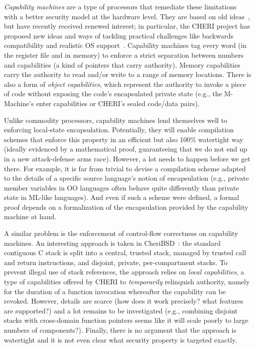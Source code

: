 \documentclass[format=acmsmall, review=true, screen=true]{acmart}
\begin{document}
\emph{Capability machines} are a type of processors that
remediate these limitations with a better security model at
the hardware level. They are based on old ideas~\citep{Carter:1994:HSF:195473.195579,Dennis:1966:PSM:365230.365252,shapiro_eros:_1999},
but have recently received renewed interest; in particular, the CHERI
project has proposed new ideas and ways of tackling practical
challenges like backwards compatibility and realistic OS
support~\citep{Watson2015Cheri,Woodruff:2014:CCM:2665671.2665740}. Capability
machines tag every word (in the register file and in memory) to
enforce a strict separation between numbers and capabilities (a kind
of pointers that carry authority). Memory capabilities carry
the authority to read and/or write to a range of memory
locations. There is also a form of \emph{object capabilities}, which represent the
authority to invoke a piece of code without exposing the code's
encapsulated private state (e.g., the M-Machine's enter capabilities or
CHERI's sealed code/data pairs).

Unlike commodity processors, capability machines lend themselves well to
enforcing local-state encapsulation. Potentially, they will enable compilation
schemes that enforce this property in an efficient but also 100\% watertight way
(ideally evidenced by a mathematical proof, guaranteeing that we do not end up
in a new attack-defense arms race). However, a lot needs to happen before we get
there. For example, it is far from trivial to devise a compilation scheme
adapted to the details of a specific source language's notion of encapsulation
(e.g., private member variables in OO languages often behave quite differently
than private state in ML-like languages). And even if such a scheme were
defined, a formal proof depends on a formalization of the encapsulation provided
by the capability machine at hand.

A similar problem is the enforcement of control-flow correctness on capability
machines. An interesting approach is taken in CheriBSD~\citep{Watson2015Cheri}:
the standard contiguous C stack is split into a central, trusted stack, managed
by trusted call and return instructions, and disjoint, private, per-compartment
stacks. To prevent illegal use of stack references, the approach relies on
\emph{local capabilities}, a type of capabilities offered by CHERI to
\emph{temporarily} relinquish authority, namely for the duration of a function
invocation whereafter the capability can be revoked. However, details are scarce
(how does it work precisely? what features are supported?) and a lot remains to
be investigated (e.g., combining disjoint stacks with cross-domain function
pointers seems like it will scale poorly to large numbers of components?).
Finally, there is no argument that the approach is watertight and it is not even
clear what security property is targeted exactly.
\end{document}
